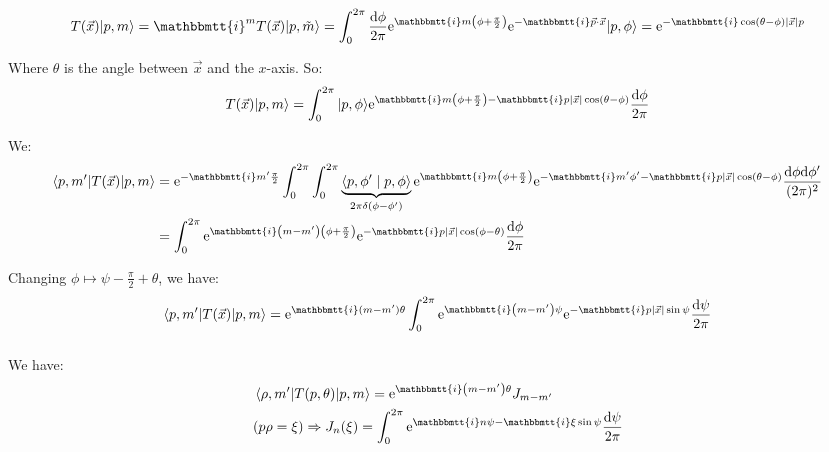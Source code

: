 \documentclass[]{ctexart}
\newcommand{\mi}{\mathbbmtt{i}}
\newcommand{\di}{\mathrm{d}}
\newcommand{\me}{\mathrm{e}}
\begin{document}
	\subsubsection{}
		\begin{equation*}
		\begin{aligned}
			T(\vec{x})|p, m\rangle=\mi^{m} T(\vec{x})|p, \tilde{m}\rangle=\int_{0}^{2 \pi} \frac{\di \phi}{2 \pi} \me^{\mi m\left(\phi+\frac{\pi}{2}\right)} \me^{-\mi \vec{p} \cdot \vec{x}}|p, \phi\rangle=\me^{-\mi\cos(\theta-\phi)|\vec{x}|p}
		\end{aligned}
		\end{equation*}
		
	Where $\theta$ is the angle between $\vec{x}$ and the $x$-axis.  So:
		\begin{equation*}
		\begin{aligned}
			T(\vec{x})|p, m\rangle=\int_{0}^{2 \pi}|p, \phi\rangle \me^{\mi m\left(\phi+\frac{\pi}{2}\right)-\mi p|\vec{x}| \cos (\theta-\phi)} \frac{\di \phi}{2 \pi}
		\end{aligned}
		\end{equation*}
	
	We:
		\begin{equation*}
		\begin{aligned}
			\left\langle p, m^{\prime}|T(\vec{x})| p, m\right\rangle&=\me^{-\mi m^{\prime} \frac{\pi}{2}} \int_{0}^{2 \pi} \int_{0}^{2 \pi}\underbrace{\left\langle p, \phi^{\prime} \mid p,\phi \right\rangle}_{2\pi\delta(\phi-\phi')} \me^{\mi m\left(\phi+\frac{\pi}{2}\right)} \me^{-\mi m^{\prime} \phi^{\prime}-\mi p|\vec{x}| \cos (\theta-\phi)} \frac{\di \phi \di \phi^{\prime}}{(2 \pi)^{2}}\\
			&=\int_{0}^{2 \pi} \me^{\mi\left(m-m^{\prime}\right)\left(\phi+\frac{\pi}{2}\right)} \me^{-\mi p|\vec{x}| \cos (\phi-\theta)} \frac{\di \phi}{2 \pi}
		\end{aligned}
		\end{equation*}
	
		Changing $\phi\mapsto \psi -\frac{\pi}{2}+\theta$, we have:
			\begin{equation*}
			\begin{aligned}
				\left\langle p, m^{\prime}|T(\vec{x})| p, m\right\rangle=\me^{\mi (m-m')\theta}\int_{0}^{2 \pi} \me^{\mi\left(m-m^{\prime}\right) \psi} \me^{-\mi p|\vec{x}| \sin \psi} \frac{\di \psi}{2 \pi}
			\end{aligned}
			\end{equation*}
		
	\subsubsection{}
		We have:
			\begin{equation*}
			\begin{aligned}
				&\left\langle \rho, m^{\prime}|T(p, \theta)| p, m\right\rangle=\me^{\mi\left(m-m^{\prime}\right) \theta}J_{m-m^{\prime}}\\
				&(p \rho=\xi)\Rightarrow J_{n}(\xi)=\int_{0}^{2 \pi} \me^{\mi n \psi-\mi \xi \sin \psi} \frac{\di \psi}{2 \pi}
			\end{aligned}
			\end{equation*}
			
\end{document}

